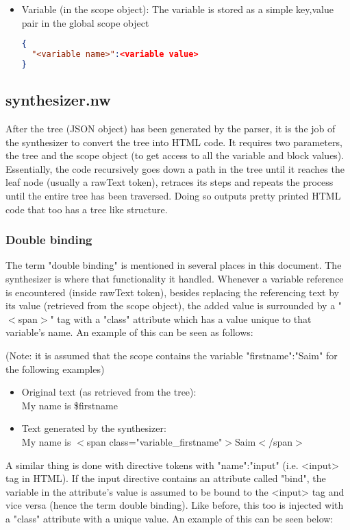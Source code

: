 \documentclass{article}
\begin{document}
\begin{itemize}
  \item Variable (in the scope object): The variable is stored as a simple key,value pair in the global scope object
\begin{lstlisting}[language=json,firstnumber=1]
{
  "<variable name>":<variable value>
}
\end{lstlisting}
\end{itemize}

\subsection{synthesizer.nw}
After the tree (JSON object) has been generated by the parser, it is the job of the synthesizer to convert the tree into HTML code. It requires two parameters, the tree and the scope object (to get access to all the variable and block values). Essentially, the code recursively goes down a path in the tree until it reaches the leaf node (usually a rawText token), retraces its steps and repeats the process until the entire tree has been traversed. Doing so outputs pretty printed HTML code that too has a tree like structure.

\subsubsection{Double binding}

The term "double binding" is mentioned in several places in this document. The synthesizer is where that functionality it handled. Whenever a variable reference is encountered (inside rawText token), besides replacing the referencing text by its value (retrieved from the scope object), the added value is surrounded by a "$<$span$>$" tag with a "class" attribute which has a value unique to that variable's name. An example of this can be seen as follows:

(Note: it is assumed that the scope contains the variable "firstname":"Saim" for the following examples)

\begin{itemize}
    \item Original text (as retrieved from the tree): \\My name is \$firstname
    \item Text generated by the synthesizer: \\My name is $<$span class="variable\_firstname"$>$Saim$<$/span$>$
\end{itemize}

A similar thing is done with directive tokens with "name":"input" (i.e. <input> tag in HTML). If the input directive contains an attribute called "bind", the variable in the attribute's value is assumed to be bound to the <input> tag and vice versa (hence the term double binding). Like before, this too is injected with a "class" attribute with a unique value. An example of this can be seen below:
\end{document}
